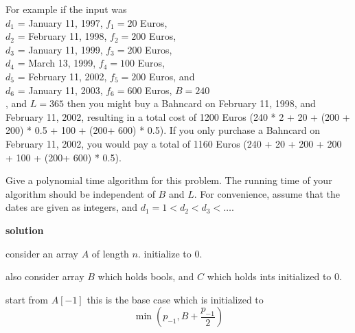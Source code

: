\documentclass[letterpaper,12pt]{article}
\begin{document}
\begin{enumerate}
For example if the input was \\
$d_1$ = January 11, 1997, $f_1=20$ Euros, \\
$d_2$ = February 11, 1998, $f_2=200$ Euros, \\
$d_3$ = January 11, 1999, $f_3=200$ Euros, \\
$d_4$ = March 13, 1999, $f_4=100$ Euros, \\
$d_5$ = February 11, 2002, $f_5=200$ Euros, and \\
$d_6$ = January 11, 2003, $f_6=600$ Euros, $B=240$\\
, and $L=365$ then
you might buy a Bahncard on February 11, 1998, and
February 11, 2002, resulting in a total cost of
1200 Euros (240 * 2 + 20 + (200 + 200) * 0.5 + 100 + (200+ 600) * 0.5). If you only purchase a Bahncard on 
February 11, 2002, you would pay a total of 1160 Euros (240 + 20 + 200 + 200 + 100 + (200+ 600) * 0.5).
 
Give a polynomial time algorithm for this problem.
The running time of your algorithm should be independent of
$B$ and $L$. For convenience, assume that the dates are given as integers, and 
$d_1 = 1 < d_2 < d_3 < \ldots$. 



\textbf{solution}






consider an array \(A\) of length \(n\). initialize to 0.

also consider array \(B\) which holds bools, and \(C\) which holds ints initialized to 0. 

start from \(A[-1]\) this is the base case which is initialized to 
\begin{equation}
    \min\left(p_{-1},B+\frac{p_{-1}}{2}\right)
\end{equation}


\end{enumerate}
\end{document}
